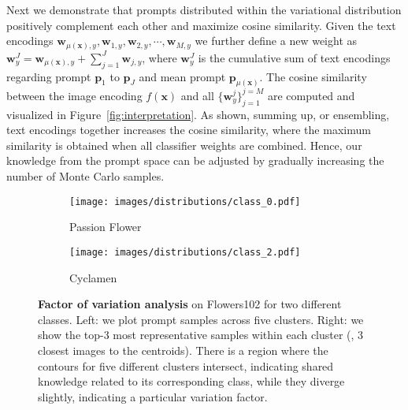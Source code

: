 \documentclass[10pt,twocolumn,letterpaper]{article}
\newcommand{\x}{\mathbf{x}}
\newcommand{\w}{\mathbf{w}}
\newcommand{\p}{\mathbf{p}}
\begin{document}
Next we demonstrate that prompts distributed within the variational distribution positively complement each other and maximize cosine similarity. Given the text encodings $\w_{\mu(\x),y}, \w_{1,y}, \w_{2,y}, \cdots, \w_{M,y}$ we further define a new weight as $\w_{y}^J {=} \w_{\mu(\x),y} + \sum_{j=1}^{J}{\w_{j,y}}$, where $\w_{y}^J$ is the cumulative sum of text encodings regarding prompt $\p_{1}$ to $\p_{J}$ and mean prompt $\p_{\mu(\x)}$. The cosine similarity between the image encoding $f(\x)$ and all $\{\w_{y}^j\}_{j=1}^{j=M}$ are computed and visualized in Figure~\ref{fig:interpretation}. 
As shown, summing up, or ensembling, text encodings together increases the cosine similarity, where the maximum similarity is obtained when all classifier weights are combined. Hence, our knowledge from the prompt space can be adjusted by gradually increasing the number of Monte Carlo samples.


\begin{figure}[ht]
\centering
\vspace{-2mm}
\begin{subfigure}{1\linewidth}
  \centering
  \texttt{[image: images/distributions/class\_0.pdf]}
  \caption{Passion Flower}
\end{subfigure}

\begin{subfigure}{1\linewidth}
  \centering
  \texttt{[image: images/distributions/class\_2.pdf]}
  \caption{Cyclamen}
\end{subfigure}

\caption{\textbf{Factor of variation analysis} on Flowers102 for two different classes. Left: we plot prompt samples across five clusters. Right: we show the top-3 most representative samples within each cluster (\eg, 3 closest images to the centroids). There is a region where the contours for five different clusters intersect, indicating shared knowledge related to its corresponding class, while they diverge slightly, indicating a particular variation factor.}
\label{fig:variation}
\vspace{-5mm}
\end{figure}
\end{document}
